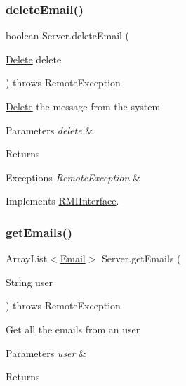 \subsubsection{\texorpdfstring{delete\+Email()}{deleteEmail()}}
{\footnotesize\ttfamily boolean Server.\+delete\+Email (\begin{DoxyParamCaption}\item[{\hyperlink{class_delete}{Delete}}]{delete }\end{DoxyParamCaption}) throws Remote\+Exception}

\hyperlink{class_delete}{Delete} the message from the system 
\begin{DoxyParams}{Parameters}
{\em delete} & \\
\hline
\end{DoxyParams}
\begin{DoxyReturn}{Returns}

\end{DoxyReturn}

\begin{DoxyExceptions}{Exceptions}
{\em Remote\+Exception} & \\
\hline
\end{DoxyExceptions}


Implements \hyperlink{interface_r_m_i_interface_a86bc2a5cb0bdb04a1aeb9b36e373cd5e}{R\+M\+I\+Interface}.

\mbox{\label{class_server_a348f49650335ef5341a4d960d6adac2e}} 
\subsubsection{\texorpdfstring{get\+Emails()}{getEmails()}}
{\footnotesize\ttfamily Array\+List$<$\hyperlink{class_email}{Email}$>$ Server.\+get\+Emails (\begin{DoxyParamCaption}\item[{String}]{user }\end{DoxyParamCaption}) throws Remote\+Exception}

Get all the emails from an user 
\begin{DoxyParams}{Parameters}
{\em user} & \\
\hline
\end{DoxyParams}
\begin{DoxyReturn}{Returns}

\begin{DoxyItemize}
\item 
\end{DoxyItemize}
\end{DoxyReturn}

